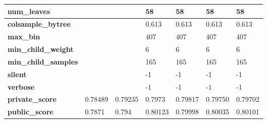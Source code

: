 \documentclass[sigconf, nonacm]{acmart}
\begin{document}
\begin{table}[t]
\begin{tabular}{@{}|l|l|l|l|l|l|l|@{}}
		\textbf{num\_leaves}             &            &            & 58         & 58         & 58         & 58         \\ \midrule
		\textbf{colsample\_bytree}       &            &            & 0.613      & 0.613      & 0.613      & 0.613      \\ \midrule
		\textbf{max\_bin}                &            &            & 407        & 407        & 407        & 407        \\ \midrule
		\textbf{min\_child\_weight}      &            &            & 6          & 6          & 6          & 6          \\ \midrule
		\textbf{min\_child\_samples}     &            &            & 165        & 165        & 165        & 165        \\ \midrule
		\textbf{silent}                  &            &            & -1         & -1         & -1         & -1         \\ \midrule
		\textbf{verbose}                 &            &            & -1         & -1         & -1         & -1         \\ \midrule
		\textbf{private\_score}          & 0.78489    & 0.79235    & 0.7973     & 0.79817    & 0.79750    & 0.79702    \\ \midrule
		\textbf{public\_score}           & 0.7871     & 0.794      & 0.80123    & 0.79998    & 0.80035    & 0.80101    \\ \bottomrule
	\end{tabular}
\end{table}
\end{document}

